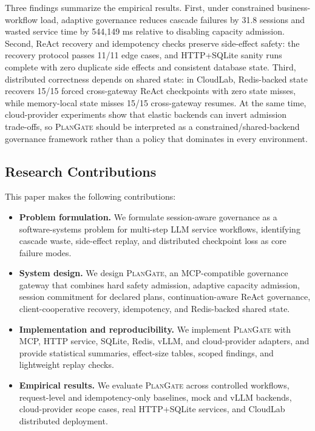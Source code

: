 \documentclass[5p,times]{elsarticle}
\newcommand{\plangate}{\textsc{PlanGate}\xspace}
\begin{document}
Three findings summarize the empirical results. First, under constrained business-workflow load, adaptive governance reduces cascade failures by 31.8 sessions and wasted service time by 544,149 ms relative to disabling capacity admission. Second, ReAct recovery and idempotency checks preserve side-effect safety: the recovery protocol passes 11/11 edge cases, and HTTP+SQLite sanity runs complete with zero duplicate side effects and consistent database state. Third, distributed correctness depends on shared state: in CloudLab, Redis-backed state recovers 15/15 forced cross-gateway ReAct checkpoints with zero state misses, while memory-local state misses 15/15 cross-gateway resumes. At the same time, cloud-provider experiments show that elastic backends can invert admission trade-offs, so \plangate should be interpreted as a constrained/shared-backend governance framework rather than a policy that dominates in every environment.

\subsection{Research Contributions}

This paper makes the following contributions:
\begin{itemize}
  \item \textbf{Problem formulation.} We formulate session-aware governance as a software-systems problem for multi-step LLM service workflows, identifying cascade waste, side-effect replay, and distributed checkpoint loss as core failure modes.
  \item \textbf{System design.} We design \plangate, an MCP-compatible governance gateway that combines hard safety admission, adaptive capacity admission, session commitment for declared plans, continuation-aware ReAct governance, client-cooperative recovery, idempotency, and Redis-backed shared state.
  \item \textbf{Implementation and reproducibility.} We implement \plangate with MCP, HTTP service, SQLite, Redis, vLLM, and cloud-provider adapters, and provide statistical summaries, effect-size tables, scoped findings, and lightweight replay checks.
  \item \textbf{Empirical results.} We evaluate \plangate across controlled workflows, request-level and idempotency-only baselines, mock and vLLM backends, cloud-provider scope cases, real HTTP+SQLite services, and CloudLab distributed deployment.
\end{itemize}
\end{document}

